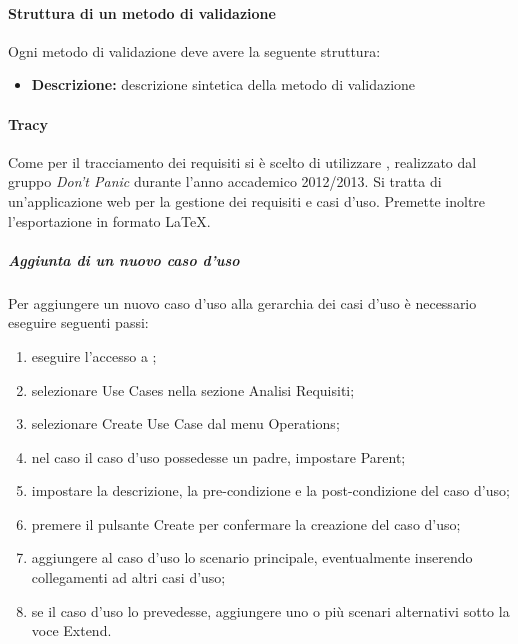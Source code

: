 \documentclass[12pt,a4paper]{article}
\begin{document}
\paragraph{Struttura di un metodo di validazione}
Ogni metodo di validazione deve avere la seguente struttura:
\begin{itemize}
	\item \textbf{Descrizione:} descrizione sintetica della metodo di validazione
\end{itemize}

 \label{tracciamento-requisiti}
\paragraph{Tracy}
Come  per il tracciamento dei requisiti si è scelto di utilizzare , realizzato dal gruppo \textit{Don’t Panic} durante l’anno accademico 2012/2013. Si tratta di un’applicazione web per la gestione dei requisiti e casi d’uso. Premette inoltre l’esportazione in formato \LaTeX{}.

\subparagraph{Aggiunta di un nuovo caso d'uso}
Per aggiungere un nuovo caso d’uso alla gerarchia dei casi d’uso è necessario eseguire seguenti passi:
\begin{enumerate}
	\item eseguire l'accesso a ;
	\item selezionare Use Cases nella sezione Analisi Requisiti; 
	\item selezionare Create Use Case dal menu Operations;
	\item nel caso il caso d'uso possedesse un padre, impostare Parent;
	\item impostare la descrizione, la pre-condizione e la post-condizione del caso d'uso; 
	\item premere il pulsante Create per confermare la creazione del caso d'uso;
	\item aggiungere al caso d'uso lo scenario principale, eventualmente inserendo collegamenti ad altri casi d'uso;
	\item se il caso d'uso lo prevedesse, aggiungere uno o più scenari alternativi sotto la voce Extend.
\end{enumerate}
\end{document}
